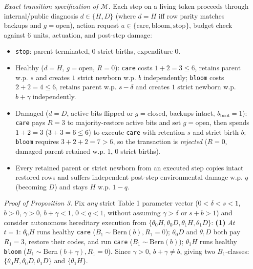 \documentclass[12pt,letterpaper]{article}
\providecommand{\tightlist}{\setlength{\itemsep}{2pt}\setlength{\parskip}{0pt}}
\begin{document}
\emph{Exact transition specification of \(\mathcal{M}\).} Each step on a
living token proceeds through internal/public diagnosis
\(d \in \{H, D\}\) (where \(d = H\) iff row parity matches backups and
\(g = \mathrm{open}\)), action request
\(a \in \{\mathrm{care}, \mathrm{bloom}, \mathrm{stop}\}\), budget check
against \(6\) units, actuation, and post-step damage:

\begin{itemize}
\tightlist
\item
  \texttt{stop}: parent terminated, \(0\) strict births, expenditure
  \(0\).
\item
  Healthy (\(d = H\), \(g = \mathrm{open}\), \(R = 0\)): \texttt{care}
  costs \(1 + 2 = 3 \le 6\), retains parent w.p. \(s\) and creates \(1\)
  strict newborn w.p. \(b\) independently; \texttt{bloom} costs
  \(2 + 2 = 4 \le 6\), retains parent w.p. \(s - \delta\) and creates
  \(1\) strict newborn w.p. \(b + \gamma\) independently.
\item
  Damaged (\(d = D\), active bits flipped or \(g = \mathrm{closed}\),
  backups intact, \(b_{\mathrm{boot}} = 1\)): \texttt{care} pays
  \(R = 3\) to majority-restore active bits and set
  \(g = \mathrm{open}\), then spends \(1 + 2 = 3\) (\(3+3=6 \le 6\)) to
  execute \texttt{care} with retention \(s\) and strict birth \(b\);
  \texttt{bloom} requires \(3 + 2 + 2 = 7 > 6\), so the transaction is
  \emph{rejected} (\(R = 0\), damaged parent retained w.p. \(1\), \(0\)
  strict births).
\item
  Every retained parent or strict newborn from an executed step copies
  intact restored rows and suffers independent post-step environmental
  damage w.p. \(q\) (becoming \(D\)) and stays \(H\) w.p. \(1-q\).
\end{itemize}

\emph{Proof of Proposition 3.} Fix \emph{any} strict Table 1 parameter
vector (\(0 < \delta < s < 1\), \(b > 0\), \(\gamma > 0\),
\(b+\gamma < 1\), \(0 < q < 1\), without assuming \(\gamma > \delta\) or
\(s+b > 1\)) and consider autonomous hereditary execution from
\(\{\theta_0 H, \theta_0 D, \theta_1 H, \theta_1 D\}\): \textbf{(1)}
\emph{At \(t=1\)}: \(\theta_0 H\) runs healthy \texttt{care}
(\(B_1 \sim \mathrm{Bern}(b), R_1 = 0\)); \(\theta_0 D\) and
\(\theta_1 D\) both pay \(R_1 = 3\), restore their codes, and run
\texttt{care} (\(B_1 \sim \mathrm{Bern}(b)\)); \(\theta_1 H\) runs
healthy \texttt{bloom} (\(B_1 \sim \mathrm{Bern}(b+\gamma), R_1 = 0\)).
Since \(\gamma > 0\), \(b + \gamma \neq b\), giving two \(B_1\)-classes:
\(\{\theta_0 H, \theta_0 D, \theta_1 D\}\) and \(\{\theta_1 H\}\).
\end{document}
